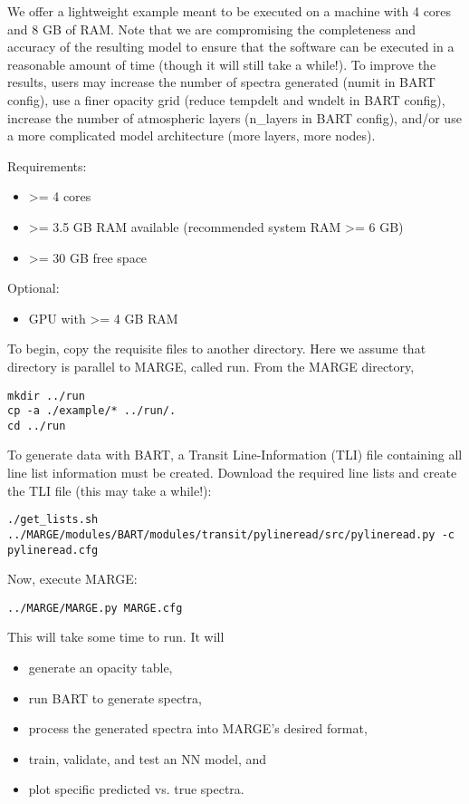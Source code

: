 \documentclass[letterpaper, 12pt]{article}
\begin{document}
We offer a lightweight example meant to be executed on a machine with 4 cores 
and 8 GB of RAM.  Note that we are compromising the completeness and accuracy 
of the resulting model to ensure that the software can be executed in a 
reasonable amount of time (though it will still take a while!).  To improve 
the results, users may increase the number of spectra generated (numit in BART 
config), use a finer opacity grid (reduce tempdelt and wndelt in BART config), 
increase the number of atmospheric layers (n\_layers in BART config), and/or 
use a more complicated model architecture (more layers, more nodes).

\noindent Requirements:
\begin{itemize}
\item >= 4 cores
\item >= 3.5 GB RAM available (recommended system RAM >= 6 GB)
\item >= 30 GB free space
\end{itemize}

\noindent Optional:
\begin{itemize}
\item GPU with >= 4 GB RAM
\end{itemize}

\noindent To begin, copy the requisite files to another directory.  Here we 
assume that directory is parallel to MARGE, called run.  From the MARGE 
directory,
\begin{verbatim}
mkdir ../run
cp -a ./example/* ../run/.
cd ../run
\end{verbatim}

\noindent To generate data with BART, a Transit Line-Information (TLI) file 
containing all line list information must be created.  Download the required 
line lists and create the TLI file (this may take a while!):
\begin{verbatim}
./get_lists.sh
../MARGE/modules/BART/modules/transit/pylineread/src/pylineread.py -c pylineread.cfg
\end{verbatim}

\noindent Now, execute MARGE:
\begin{verbatim}
../MARGE/MARGE.py MARGE.cfg
\end{verbatim}

\noindent This will take some time to run.  It will 

\begin{itemize}
\item generate an opacity table,
\item run BART to generate spectra,
\item process the generated spectra into MARGE's desired format,
\item train, validate, and test an NN model, and
\item plot specific predicted vs. true spectra.
\end{itemize}
\end{document}

